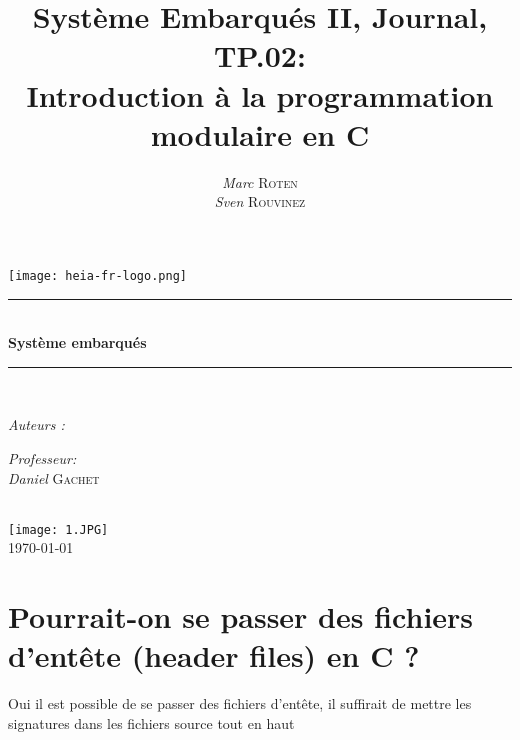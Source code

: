 

\title{Système Embarqués II, Journal, TP.02:\\ Introduction à la programmation modulaire en C} 
\author{\textsl{Marc} \textsc{Roten} \\ \textsl{Sven} \textsc{Rouvinez}}
\date{}


    \begin{titlepage}
        \begin{center}
            \texttt{[image: heia-fr-logo.png]}\\[1.3cm]
            
            \rule{\linewidth}{0.3mm} \\[0.3cm]
            {\huge \bfseries Système embarqués \\[0.5cm]} 
            \rule{\linewidth}{0.3mm} \\[0.8cm]
            \noindent
            \begin{minipage}[t]{0.4\textwidth}
                \begin{flushleft} \large
                    \emph{Auteurs :}\\
                    \theauthor
                \end{flushleft}
            \end{minipage}
            \begin{minipage}[t]{0.4\textwidth} 
                \begin{flushright} \large
                    \emph{Professeur:}\\
                    \textsl{Daniel} \textsc{Gachet}\\ 
                \end{flushright} 
                \vfill
            \end{minipage}\\[1.3cm]
            \texttt{[image: 1.JPG]}\\[1.5cm]
            \vspace*{1\baselineskip}
            \today \\[0.7cm]
        \end{center}
    \end{titlepage}
    \tableofcontents
    \clearpage

\section{Pourrait-on se passer des fichiers d'entête (header files) en C ?} 
Oui il est possible de se passer des fichiers d'entête, il suffirait de mettre les signatures dans les fichiers source tout en haut

